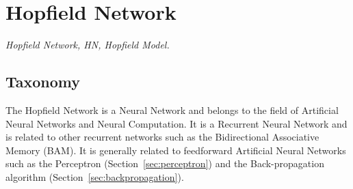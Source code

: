 

\section{Hopfield Network} 
\label{sec:hopfield}

\emph{Hopfield Network, HN, Hopfield Model.}

\subsection{Taxonomy}
The Hopfield Network is a Neural Network and belongs to the field of Artificial Neural Networks and Neural Computation.
It is a Recurrent Neural Network and is related to other recurrent networks such as the Bidirectional Associative Memory (BAM).
It is generally related to feedforward Artificial Neural Networks such as the Perceptron (Section~\ref{sec:perceptron}) and the Back-propagation algorithm (Section~\ref{sec:backpropagation}).

